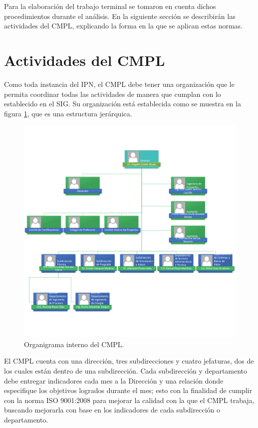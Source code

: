 	Para la elaboración del trabajo terminal se tomaron en cuenta dichos procedimientos durante el análisis. En la siguiente sección se describirán las actividades del CMPL, explicando la forma en la que se aplican estas normas.
	
\section{Actividades del CMPL}
	Como toda instancia del IPN, el CMPL debe tener una organización que le permita coordinar todas las actividades de manera que cumplan con lo establecido en el SIG. Su organización está establecida como se muestra en la figura \ref{fig:organigrama}, que es una estructura jerárquica.\\
	
	\begin{figure}[htbp!]
		\centering
			\includegraphics[width=1.2\textwidth]{images/Organigrama.png}
		\caption{Organigrama interno del CMPL. \cite{Organigrama}}
		\label{fig:organigrama}
	\end{figure}
	
	El CMPL cuenta con una dirección, tres subdirecciones y cuatro jefaturas, dos de los cuales están dentro de una subdirección. Cada subdirección y departamento debe entregar indicadores cada mes a la Dirección y una relación donde especifique los objetivos logrados durante el mes; esto con la finalidad de cumplir con la norma ISO 9001:2008 para mejorar la calidad con la que el CMPL trabaja, buscando mejorarla con base en los indicadores de cada subdirección o departamento.\\
	
